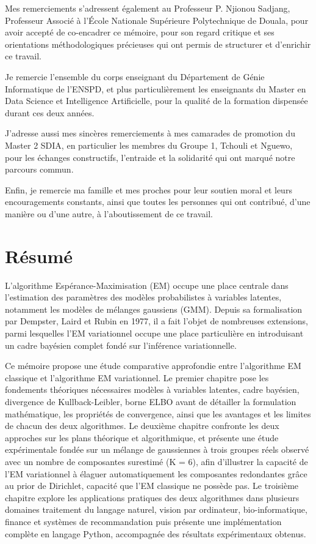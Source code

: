 Mes remerciements s'adressent également au Professeur P. Njionou Sadjang, Professeur Associé à l'École Nationale Supérieure Polytechnique de Douala, pour avoir accepté de co-encadrer ce mémoire, pour son regard critique et ses orientations méthodologiques précieuses qui ont permis de structurer et d'enrichir ce travail.

Je remercie l'ensemble du corps enseignant du Département de Génie Informatique de l'ENSPD, et plus particulièrement les enseignants du Master en Data Science et Intelligence Artificielle, pour la qualité de la formation dispensée durant ces deux années.

J'adresse aussi mes sincères remerciements à mes camarades de promotion du Master 2 SDIA, en particulier les membres du Groupe 1, Tchouli et Nguewo, pour les échanges constructifs, l'entraide et la solidarité qui ont marqué notre parcours commun.

Enfin, je remercie ma famille et mes proches pour leur soutien moral et leurs encouragements constants, ainsi que toutes les personnes qui ont contribué, d'une manière ou d'une autre, à l'aboutissement de ce travail.


\chapter*{Résumé}
L'algorithme Espérance-Maximisation (EM) occupe une place centrale dans l'estimation des paramètres des modèles probabilistes à variables latentes, notamment les modèles de mélanges gaussiens (GMM). Depuis sa formalisation par Dempster, Laird et Rubin en 1977, il a fait l'objet de nombreuses extensions, parmi lesquelles l'EM variationnel occupe une place particulière en introduisant un cadre bayésien complet fondé sur l'inférence variationnelle.

Ce mémoire propose une étude comparative approfondie entre l'algorithme EM classique et l'algorithme EM variationnel. Le premier chapitre pose les fondements théoriques nécessaires  modèles à variables latentes, cadre bayésien, divergence de Kullback-Leibler, borne ELBO  avant de détailler la formulation mathématique, les propriétés de convergence, ainsi que les avantages et les limites de chacun des deux algorithmes. Le deuxième chapitre confronte les deux approches sur les plans théorique et algorithmique, et présente une étude expérimentale fondée sur un mélange de gaussiennes à trois groupes réels observé avec un nombre de composantes surestimé (K = 6), afin d'illustrer la capacité de l'EM variationnel à élaguer automatiquement les composantes redondantes grâce au prior de Dirichlet, capacité que l'EM classique ne possède pas. Le troisième chapitre explore les applications pratiques des deux algorithmes dans plusieurs domaines  traitement du langage naturel, vision par ordinateur, bio-informatique, finance et systèmes de recommandation  puis présente une implémentation complète en langage Python, accompagnée des résultats expérimentaux obtenus.

